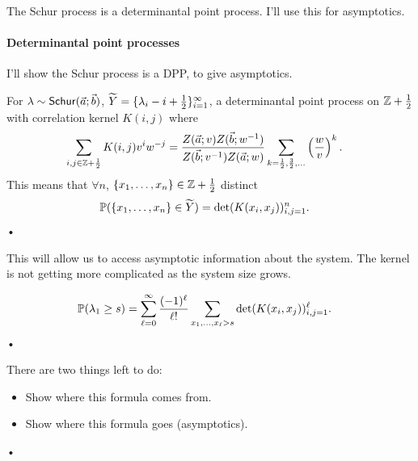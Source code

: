 The Schur process is a determinantal point process. I'll use this for asymptotics.



\paragraph{Determinantal point processes}
I'll show the Schur process is a DPP, to give asymptotics.
\begin{thm}
For $\lambda\sim \mathsf{Schur}(\vec a; \vec b)$, $\widetilde{Y} =\{\lambda_i-i+\frac{1}{2}\}_{i=1}^\infty$, a determinantal point process on $\mathbb{Z}+\frac{1}{2}$ with correlation kernel $K(i,j)$ where 
\begin{align*}
\sum_{i,j\in \mathbb{Z}+\frac{1}{2}} K(i,j)v^i w^{-j} &= \frac{Z(\vec a;v)Z(\vec b;w^{-1})}{Z(\vec b;v^{-1})Z(\vec a;w)}\sum_{k=\frac{1}{2},\frac{3}{2},\ldots} \left( {\frac{w}{v}} \right)^k.
\end{align*}
This means that $\forall n$, $\{x_1,\ldots, x_n\}\in \mathbb{Z}+\frac{1}{2}$ distinct
\begin{align*}
\mathbb{P}(\{x_1,\ldots, x_n\}\in \widetilde{Y}) &= \det(K(x_i,x_j))_{i,j=1}^n.
\end{align*}•
\end{thm}
This will allow us to access asymptotic information about the system. The kernel is not getting more complicated as the system size grows.

\begin{exr}
\begin{align*}
\mathbb{P}(\lambda_1\ge s) & =\sum_{\ell=0}^{\infty} \frac{(-1)^\ell}{\ell!} \sum_{x_1,\ldots, x_\ell>s}\det(K(x_i,x_j))_{i,j=1}^\ell.
\end{align*}•
\end{exr}
There are two things left to do:
\begin{itemize}
\item
Show where this formula comes from.
\item
Show where this formula goes (asymptotics).
\end{itemize}•

